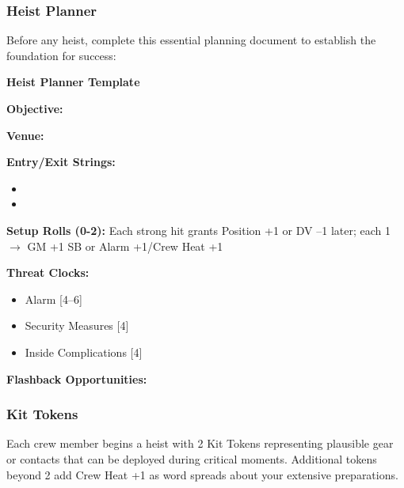 \documentclass[11pt]{article}
\begin{document}
\subsubsection{Heist Planner}

Before any heist, complete this essential planning document to establish the foundation for success:

\begin{framed}
\noindent\textbf{Heist Planner Template}

\noindent\textbf{Objective:} \hrulefill

\noindent\textbf{Venue:} \hrulefill

\noindent\textbf{Entry/Exit Strings:} 
\begin{itemize}
    \item \hrulefill
    \item \hrulefill
\end{itemize}

\noindent\textbf{Setup Rolls (0-2):} Each strong hit grants Position +1 or DV --1 later; each 1 $\rightarrow$ GM +1 SB or Alarm +1/Crew Heat +1

\noindent\textbf{Threat Clocks:} 
\begin{itemize}
    \item Alarm [4--6] \hrulefill
    \item Security Measures [4] \hrulefill
    \item Inside Complications [4] \hrulefill
\end{itemize}

\noindent\textbf{Flashback Opportunities:} \hrulefill
\end{framed}

\subsubsection{Kit Tokens}

Each crew member begins a heist with 2 Kit Tokens representing plausible gear or contacts that can be deployed during critical moments. Additional tokens beyond 2 add Crew Heat +1 as word spreads about your extensive preparations.
\end{document}
